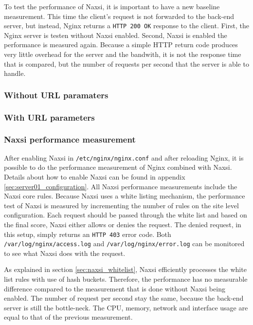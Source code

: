 \documentclass[Measurements]{subfiles}
\begin{document}
To test the performance of Naxsi, it is important to have a new baseline measurement. This time the client's request is not forwarded to the back-end server, but instead, Nginx returns a \verb+HTTP 200 OK+ response to the client. First, the Nginx server is testen without Naxsi enabled. Second, Naxsi is enabled the performance is measured again. Because a simple HTTP return code produces very little overhead for the server and the bandwith, it is not the response time that is compared, but the number of requests per second that the server is able to handle.

\subsubsection{Without URL paramaters}
\subsubsection{With URL parameters}

\subsubsection{Naxsi performance measurement}

After enabling Naxsi in \verb+/etc/nginx/nginx.conf+ and after reloading Nginx, it is possible to do the performance measurement of Nginx combined with Naxsi. Details about how to enable Naxsi can be found in appendix \ref{sec:server01_configuration}. All Naxsi performance measurements include the Naxsi core rules. Because Naxsi uses a white listing mechanism, the performance test of Naxsi is measured by incrementing the number of rules on the site level configuration. Each request should be passed through the white list and based on the final score, Naxsi either allows or denies the request. The denied request, in this setup, simply returns an \verb+HTTP 403+ error code. Both \verb+/var/log/nginx/access.log+ and \verb+/var/log/nginx/error.log+ can be monitored to see what Naxsi does with the request.

As explained in section \ref{sec:naxsi_whitelist}, Naxsi efficiently processes the white list rules with use of hash buckets. Therefore, the performance has no measurable difference compared to the measurement that is done without Naxsi being enabled. The number of request per second stay the same, because the back-end server is still the bottle-neck. The CPU, memory, network and interface usage are equal to that of the previous measurement.
\end{document}
